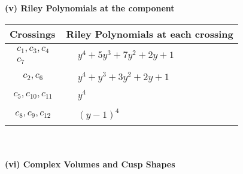 \documentclass[1p]{elsarticle_modified}
\theoremstyle{definition}
\begin{document}
\newpage\renewcommand{\arraystretch}{1}
\flushleft \textbf{(v) Riley Polynomials at the component}\newline \\
\begin{tabular}{m{50pt}|m{274pt}}
Crossings & \hspace{64pt}Riley Polynomials at each crossing \\
\hline $$\begin{aligned}c_{1},c_{3},c_{4}\\c_{7}\end{aligned}$$&$\begin{aligned}
&y^4+5 y^3+7 y^2+2 y+1
\end{aligned}$\\
\hline $$\begin{aligned}c_{2},c_{6}\end{aligned}$$&$\begin{aligned}
&y^4+y^3+3 y^2+2 y+1
\end{aligned}$\\
\hline $$\begin{aligned}c_{5},c_{10},c_{11}\end{aligned}$$&$\begin{aligned}
&y^4
\end{aligned}$\\
\hline $$\begin{aligned}c_{8},c_{9},c_{12}\end{aligned}$$&$\begin{aligned}
&(y-1)^4
\end{aligned}$\\
\hline
\end{tabular}\\~\\
\newpage\flushleft \textbf{(vi) Complex Volumes and Cusp Shapes}
\end{document}

